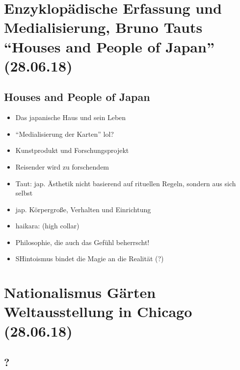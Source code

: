 \documentclass[emulatestandardclasses]{scrartcl}
\begin{document}
\section{Enzyklopädische Erfassung und Medialisierung, Bruno Tauts "`Houses and People of Japan"'
\\(28.06.18)}


\subsection{Houses and People of Japan}

\begin{itemize}
  \item Das japanische Haus und sein Leben
  \item "`Medialisierung der Karten"' lol?
  \item Kunstprodukt und Forschungsprojekt
  \item Reisender wird zu forschendem
  \item Taut: jap. Ästhetik nicht basierend auf rituellen Regeln, sondern aus sich selbst
  \item jap. Körpergroße, Verhalten und Einrichtung 
  \item haikara: (high collar) 
  \item Philosophie, die auch das Gefühl beherrscht!
  \item SHintoismus bindet die Magie an die Realität (?)
\end{itemize}


\section{Nationalismus Gärten Weltausstellung in Chicago
\\(28.06.18)}


\subsection{?}
\end{document}
